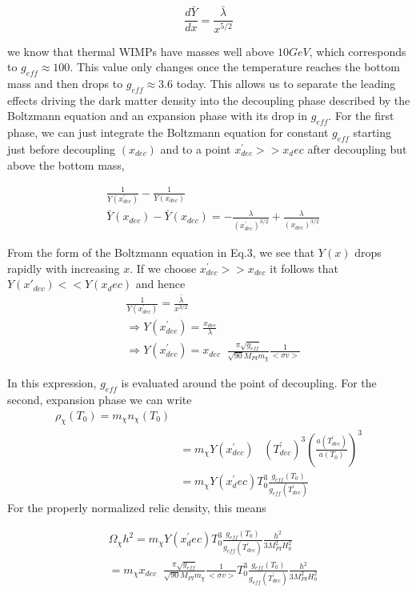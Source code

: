 \documentclass[12pt]{report}
\begin{document}
$$\frac{d\bar {Y} }{dx}= \frac{\bar{\lambda}}{x^{5/2}}$$

we know that thermal WIMPs have masses well above $10 GeV$, which corresponds to $g_{eff} \approx 100$.
This value only changes once the temperature reaches the bottom mass and then drops to $g_{eff} \approx 3.6$ today. This allows us to separate the leading effects driving the dark matter density into the decoupling phase described by the Boltzmann equation and an expansion phase with its drop in $g_{eff}$. For the first phase, we can just integrate the Boltzmann equation for constant $g_{eff}$ starting just before decoupling $(x_{dec} )$ and to a point $x^\prime_{dec}>> x_dec$ after decoupling but above the bottom mass,

\begin{align*}
& \frac{1}{Y(x^\prime_{dec})}- \frac{1}{Y(x_{dec})}\\
& \bar{Y}(x_{dec})- \bar{Y}(x_{dec}) = -\frac{\lambda}{(x^\prime_{dec})^{3/2}} + \frac{\lambda}{(x_{dec})^{3/2}}
\end{align*}

From the form of the Boltzmann equation in Eq.$3$, we see that $Y (x)$ drops rapidly with increasing $x$. If we
choose $x^\prime_{dec} >> x_{dec}$ it follows that $Y(x\prime_{dec} ) << Y(x_dec )$ and hence
\begin{align*}
&\frac{1}{Y(x^\prime_{dec})} =\frac{\bar{\lambda}}{x^{3/2}}\\
&\Rightarrow Y(x^\prime_{dec}) =\frac{x_{dec}}{\lambda}\\
&\Rightarrow Y(x^\prime_{dec})= x_{dec} \; \; \frac{\pi \sqrt{g_{eff}}}{\sqrt{90} M_{PI} m_\chi} \frac{1}{<\sigma v>}
\end{align*}

In this expression, $g_{eff}$ is evaluated around the point of decoupling. For the second, expansion phase we can write
\begin{align*}
\rho_\chi(T_0)= m_\chi n_\chi(T_0)\\
& = m_\chi Y(x^\prime_{dec})\; \;\; (T^\prime_{dec})^3 \left( \frac{a(T^\prime_{dec})}{a(T_0)}\right)^3\\
&= m_\chi Y(x^\prime_dec) T^3_0 \frac{g_{eff}(T_0)}{g_{eff}(T^\prime_{dec})}
\end{align*}
For the properly normalized relic density, this means

\begin{align*}
& \Omega_\chi h^2 = m_\chi Y(x^\prime_dec) T^3_0 \frac{g_{eff}(T_0)}{g_{eff}(T^\prime_{dec})} \frac{h^2}{3 M^2_{PI} H^2_0}\\
& = m_\chi x_{dec} \; \; \frac{\pi \sqrt{g_{eff}}}{\sqrt{90} M_{PI} m_\chi} \frac{1}{<\sigma v>} T^3_0 \frac{g_{eff}(T_0)}{g_{eff}(T^\prime_{dec})} \frac{h^2}{3 M^2_{PI} H^2_0}
\end{align*}
\end{document}
